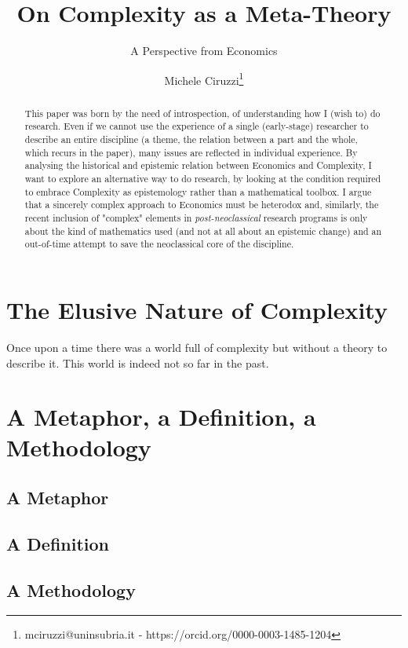 \documentclass[a4paper, headings=standardclasses]{scrartcl}
\title{On Complexity as a Meta-Theory}
\subtitle{A Perspective from Economics}
\author{Michele Ciruzzi\thanks{mciruzzi@uninsubria.it - https://orcid.org/0000-0003-1485-1204}}
\begin{document}
	
	\maketitle
	
	\begin{abstract}
This paper was born by the need of introspection, of understanding how I (wish to) do research. Even if we cannot use the experience of a single (early-stage) researcher to describe an entire discipline (a theme, the relation between a part and the whole, which recurs in the paper), many issues are reflected in individual experience.
By analysing the historical and epistemic relation between Economics and Complexity, I want to explore an alternative way to do research, by looking at the condition required to embrace Complexity as epistemology rather than a mathematical toolbox. 
I argue that a sincerely complex approach to Economics must be heterodox and, similarly, the recent inclusion of "complex" elements in \textit{post-neoclassical} research programs is only about the kind of mathematics used (and not at all about an epistemic change) and an out-of-time attempt to save the neoclassical core of the discipline.
	\end{abstract}
	
	\section{The Elusive Nature of Complexity}
Once upon a time there was a world full of complexity but without a theory to describe it. This world is indeed not so far in the past.


	
	\section{A Metaphor, a Definition, a Methodology}
	\subsection{A Metaphor}
	
	\subsection{A Definition}
	
	\subsection{A Methodology}
	
\end{document}
